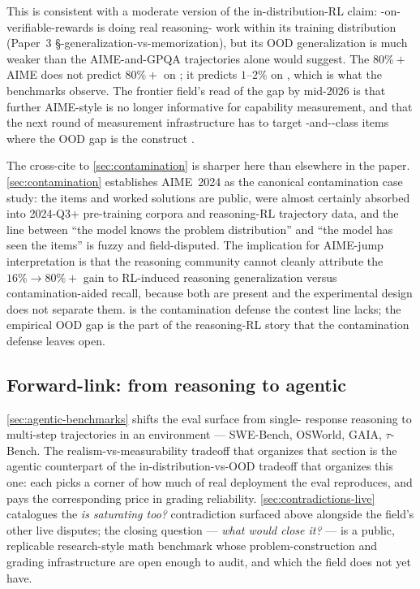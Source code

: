 This is consistent with a moderate version of the
in-distribution-RL claim: -on-verifiable-rewards is doing
real reasoning- work within its training distribution
(Paper~3 §-generalization-vs-memorization), but
its OOD generalization is much weaker than the AIME-and-GPQA
trajectories alone would suggest. The $80\%+$ AIME  does
not predict $80\%+$ on ; it predicts $1$--$2\%$ on
, which is what the benchmarks observe. The frontier
field's read of the gap by mid-2026 is that further AIME-style
 is no longer informative for capability measurement,
and that the next round of measurement infrastructure has to
target -and--class items where the OOD gap is the
construct .

The cross-cite to \cref{sec:contamination} is sharper here than
elsewhere in the paper. \cref{sec:contamination} establishes
AIME~2024 as the canonical contamination case study: the items and
worked solutions are public, were almost certainly absorbed into
2024-Q3+ pre-training corpora and reasoning-RL trajectory data, and
the line between ``the model knows the problem distribution'' and
``the model has seen the items'' is fuzzy and field-disputed. The
implication for AIME-jump interpretation is that the reasoning
community cannot cleanly attribute the $16\% \to 80\%+$ gain to
RL-induced reasoning generalization versus contamination-aided
recall, because both are present and the experimental design does
not separate them.  is the contamination defense the
contest line lacks; the empirical OOD gap is the part of the
reasoning-RL story that the contamination defense leaves open.

\subsection{Forward-link: from reasoning to agentic}
\label{sec:reasoning-forward}

\cref{sec:agentic-benchmarks} shifts the eval surface from single-
response reasoning to multi-step trajectories in an environment ---
SWE-Bench, OSWorld, GAIA, $\tau$-Bench. The realism-vs-measurability
tradeoff that organizes that section is the agentic counterpart of
the in-distribution-vs-OOD tradeoff that organizes this one: each
 picks a corner of how much of real deployment
the eval reproduces, and pays the corresponding price in grading
reliability. \cref{sec:contradictions-live} catalogues the
\emph{is  saturating too?} contradiction surfaced above
alongside the field's other live disputes; the closing
question --- \emph{what would close it?} --- is a public,
replicable research-style math benchmark whose problem-construction
and grading infrastructure are open enough to audit, and which the
field does not yet have.
